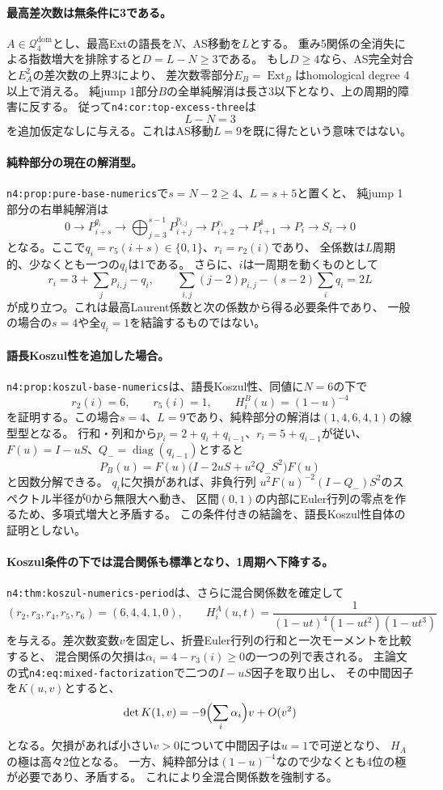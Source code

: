 \documentclass[11pt,a4paper]{ltjsarticle}
\newcommand{\Ext}{\operatorname{Ext}}
\begin{document}
\paragraph{最高差次数は無条件に3である。}
$A\in\mathcal Q_4^{\mathrm{dom}}$とし、最高Extの語長を$N$、AS移動を$L$とする。
重み5関係の全消失による指数増大を排除すると$D=L-N\geq3$である。
もし$D\geq4$なら、AS完全対合と$E_A^2$の差次数の上界3により、
差次数零部分$E_B=\Ext_B$はhomological degree 4以上で消える。
純jump 1部分$B$の全単純解消は長さ3以下となり、上の周期的障害に反する。
従って\texttt{n4:cor:top-excess-three}は
\[
L-N=3
\]
を追加仮定なしに与える。これはAS移動$L=9$を既に得たという意味ではない。

\paragraph{純粋部分の現在の解消型。}
\texttt{n4:prop:pure-base-numerics}で$s=N-2\geq4$、$L=s+5$と置くと、
純jump 1部分の右単純解消は
\[
0\longrightarrow P_{i+s}^{q_i}
\longrightarrow\bigoplus_{j=3}^{s-1}P_{i+j}^{p_{i,j}}
\longrightarrow P_{i+2}^{r_i}\longrightarrow P_{i+1}^{4}
\longrightarrow P_i\longrightarrow S_i\longrightarrow0
\]
となる。ここで$q_i=r_5(i+s)\in\{0,1\}$、$r_i=r_2(i)$であり、
全係数は$L$周期的、少なくとも一つの$q_i$は1である。
さらに、$i$は一周期を動くものとして
\[
r_i=3+\sum_jp_{i,j}-q_i,\qquad
\sum_{i,j}(j-2)p_{i,j}-(s-2)\sum_iq_i=2L
\]
が成り立つ。これは最高Laurent係数と次の係数から得る必要条件であり、
一般の場合の$s=4$や全$q_i=1$を結論するものではない。

\paragraph{語長Koszul性を追加した場合。}
\texttt{n4:prop:koszul-base-numerics}は、語長Koszul性、同値に$N=6$の下で
\[
r_2(i)=6,\qquad r_5(i)=1,\qquad
H_i^B(u)=(1-u)^{-4}
\]
を証明する。この場合$s=4$、$L=9$であり、純粋部分の解消は$(1,4,6,4,1)$の線型型となる。
行和・列和から$p_i=2+q_i+q_{i-1}$、$r_i=5+q_{i-1}$が従い、
$F(u)=I-uS$、$Q_- =\operatorname{diag}(q_{i-1})$とすると
\[
P_B(u)=F(u)\bigl(I-2uS+u^2Q_-S^2\bigr)F(u)
\]
と因数分解できる。
$q_i$に欠損があれば、非負行列
$u^2F(u)^{-2}(I-Q_-)S^2$のスペクトル半径が0から無限大へ動き、
区間$(0,1)$の内部にEuler行列の零点を作るため、多項式増大と矛盾する。
この条件付きの結論を、語長Koszul性自体の証明としない。

\paragraph{Koszul条件の下では混合関係も標準となり、1周期へ下降する。}
\texttt{n4:thm:koszul-numerics-period}は、さらに混合関係数を確定して
\[
(r_2,r_3,r_4,r_5,r_6)=(6,4,4,1,0),\qquad
H_i^A(u,t)=\frac1{(1-ut)^4(1-ut^2)(1-ut^3)}
\]
を与える。差次数変数$v$を固定し、折畳Euler行列の行和と一次モーメントを比較すると、
混合関係の欠損は$\alpha_i=4-r_3(i)\geq0$の一つの列で表される。
主論文の式\texttt{n4:eq:mixed-factorization}で二つの$I-uS$因子を取り出し、
その中間因子を$K(u,v)$とすると、
\[
\det K(1,v)=-9\Bigl(\sum_i\alpha_i\Bigr)v+O(v^2)
\]
となる。欠損があれば小さい$v>0$について中間因子は$u=1$で可逆となり、
$H_A$の極は高々2位となる。
一方、純粋部分は$(1-u)^{-4}$なので少なくとも4位の極が必要であり、矛盾する。
これにより全混合関係数を強制する。
\end{document}
